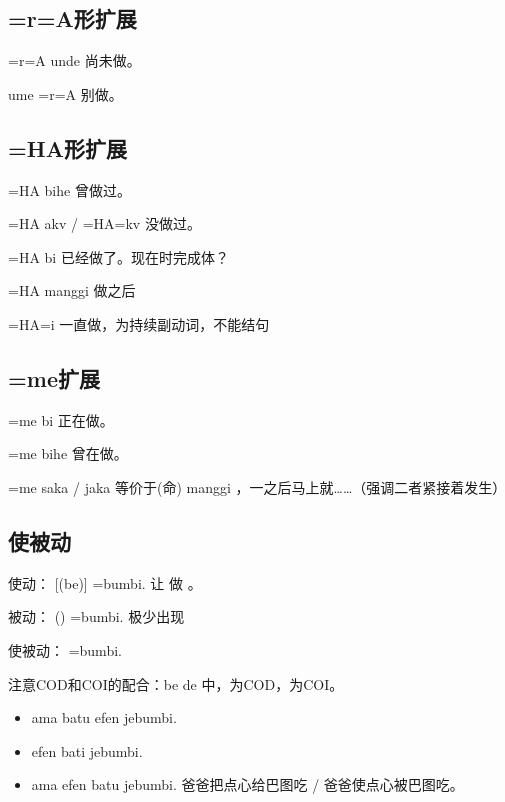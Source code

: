 \subsection{=r=A形扩展}

\begin{des}
    \item[\V =r=A unde] 尚未做。
    \item[ume \V =r=A] 别做\V 。
\end{des}

\subsection{=HA形扩展}

\begin{des}
    \item[\V =HA bihe] 曾做过。
    \item[\V =HA akv / \V =HA=kv] 没做过。
    \item[\V =HA bi] 已经做了\V 。现在时完成体？ 
    \item[\V =HA manggi] 做\V 之后
    \item[\V =HA=i] 一直做，为持续副动词，不能结句
\end{des}

\subsection{=me扩展}

\begin{des}
    \item[\V =me bi] 正在做。
    \item[\V =me bihe] 曾在做。
    \item[\V =me saka / jaka] 等价于\V (命) manggi ，一\V 之后马上就……（强调二者紧接着发生）
\end{des}

\subsection{使被动}

使动：\A \B {} [\C (be)] \V =bumbi. \A 让 \B 做 \V \C 。

被动：\A \B {} (\C) \V =bumbi. \C 极少出现

使被动：\A \B {} \C {} \V =bumbi. 

注意COD和COI的配合：\A \B be \C de 中，\B 为COD，\C 为COI。

\begin{itemize}
    \item ama batu  efen jebumbi.
    \item efen bati  jebumbi.
    \item ama efen  batu  jebumbi. 爸爸把点心给巴图吃 / 爸爸使点心被巴图吃。
\end{itemize}


